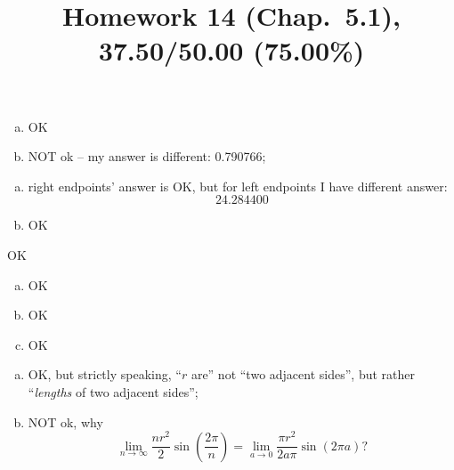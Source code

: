 \documentclass[10pt]{article} %
\title{Homework 14 (Chap.~5.1),
37.50/50.00 (75.00\%)
}
\begin{document}
\maketitle
{}
\begin{enumerate}[(a)]
  \item OK
  \item NOT ok -- my answer is different: 0.790766;
\end{enumerate}
\begin{enumerate}[(a)]
  \item right endpoints' answer is OK, but for left endpoints I have different answer:
    \begin{equation*}
      24.284400
    \end{equation*}
  \item OK
\end{enumerate}
OK
\begin{enumerate}[(a)]
	\item OK
	\item OK
	\item OK
\end{enumerate}
\begin{enumerate}[(a)]
	\item OK, but strictly speaking, ``$r$ are'' not ``two adjacent sides'',
		but rather ``\textit{lengths} of two adjacent sides'';
	\item NOT ok, why
		\begin{equation*}
			\lim_{n\to\infty}\frac{nr^2}{2}\sin\left( \frac{2\pi}{n} \right)
			=\lim_{a\to0}\frac{\pi r^2}{2a\pi}\sin\left( 2\pi a \right)?
		\end{equation*}
\end{enumerate}
\end{document}

